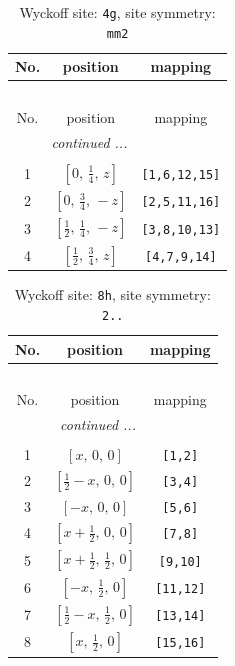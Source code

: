 \documentclass[fleqn,8pt]{jsarticle}
\begin{document}
\renewcommand{\arraystretch}{1.2}
\begin{longtable}{ccc}
\caption{Wyckoff site: {\tt 4g}, site symmetry: {\tt mm2}}
 \\
 \hline \hline
No. & position & mapping \\ \hline \endfirsthead

\multicolumn{2}{l}{\tablename\ \thetable{}} \\
 \hline \hline
No. & position & mapping \\ \hline \endhead

 \hline \hline
\multicolumn{2}{r}{\footnotesize\it continued ...} \\ \endfoot

 \hline \hline
\multicolumn{2}{r}{} \\ \endlastfoot

1 & $\left[ 0,\, \frac{1}{4},\, z \right]$ & {\tt [1,6,12,15]} \\ \hline
2 & $\left[ 0,\, \frac{3}{4},\, - z \right]$ & {\tt [2,5,11,16]} \\ \hline
3 & $\left[ \frac{1}{2},\, \frac{1}{4},\, - z \right]$ & {\tt [3,8,10,13]} \\ \hline
4 & $\left[ \frac{1}{2},\, \frac{3}{4},\, z \right]$ & {\tt [4,7,9,14]} \\
\end{longtable}
\renewcommand{\arraystretch}{1.2}
\begin{longtable}{ccc}
\caption{Wyckoff site: {\tt 8h}, site symmetry: {\tt 2..}}
 \\
 \hline \hline
No. & position & mapping \\ \hline \endfirsthead

\multicolumn{2}{l}{\tablename\ \thetable{}} \\
 \hline \hline
No. & position & mapping \\ \hline \endhead

 \hline \hline
\multicolumn{2}{r}{\footnotesize\it continued ...} \\ \endfoot

 \hline \hline
\multicolumn{2}{r}{} \\ \endlastfoot

1 & $\left[ x,\, 0,\, 0 \right]$ & {\tt [1,2]} \\ \hline
2 & $\left[ \frac{1}{2} - x,\, 0,\, 0 \right]$ & {\tt [3,4]} \\ \hline
3 & $\left[ - x,\, 0,\, 0 \right]$ & {\tt [5,6]} \\ \hline
4 & $\left[ x + \frac{1}{2},\, 0,\, 0 \right]$ & {\tt [7,8]} \\ \hline
5 & $\left[ x + \frac{1}{2},\, \frac{1}{2},\, 0 \right]$ & {\tt [9,10]} \\ \hline
6 & $\left[ - x,\, \frac{1}{2},\, 0 \right]$ & {\tt [11,12]} \\ \hline
7 & $\left[ \frac{1}{2} - x,\, \frac{1}{2},\, 0 \right]$ & {\tt [13,14]} \\ \hline
8 & $\left[ x,\, \frac{1}{2},\, 0 \right]$ & {\tt [15,16]} \\
\end{longtable}
\end{document}
